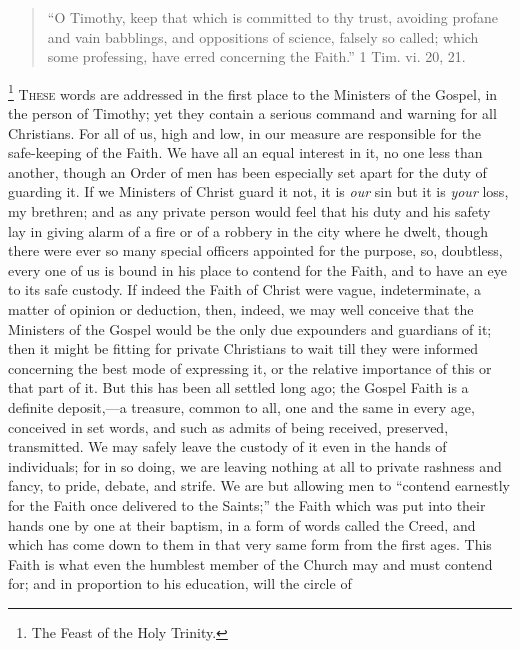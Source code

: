 
\begin{quote}

``O Timothy, keep that which is committed to thy trust,
avoiding profane and vain babblings, and oppositions of science,
falsely so called; which some professing, have erred concerning the
Faith.'' 1 Tim. vi. 20, 21.

\end{quote}

\footnote{The Feast of the Holy Trinity.} T\textsc{hese} words are
addressed in the first place to the Ministers of the Gospel, in the
person of Timothy; yet they contain a serious command and warning for
all Christians. For all of us, high and low, in our measure are
responsible for the safe-keeping of the Faith. We have all an equal
interest in it, no one less than another, though an Order of men has
been especially set apart for the duty of guarding it. If we Ministers
of Christ guard it not, it is \emph{our} sin but it is \emph{your} loss,
my brethren; and as any private person would feel that his duty and his
safety lay in giving alarm of a fire or of a robbery in the city where
he dwelt, though there were ever so many special officers appointed for
the purpose, so, doubtless, every one of us is bound in his place to
contend for the Faith, and to have an eye to its safe custody. If indeed
the Faith of Christ were vague, indeterminate, a matter of opinion or
deduction, then, indeed, we may well conceive that the Ministers of the
Gospel would be the only due expounders and guardians of it; then it
might be fitting for private Christians to wait till they were informed
concerning the best mode of expressing it, or the relative importance of
this or that part of it. But this has been all settled long ago; the
Gospel Faith is a definite deposit,—a treasure, common to all, one and
the same in every age, conceived in set words, and such as admits of
being received, preserved, transmitted. We may safely leave the custody
of it even in the hands of individuals; for in so doing, we are leaving
nothing at all to private rashness and fancy, to pride, debate, and
strife. We are but allowing men to ``contend earnestly for the Faith
once delivered to the Saints;'' the Faith which was put into their
hands one by one at their baptism, in a form of words called the Creed,
and which has come down to them in that very same form from the first
ages. This Faith is what even the humblest member of the Church may and
must contend for; and in proportion to his education, will the circle of
